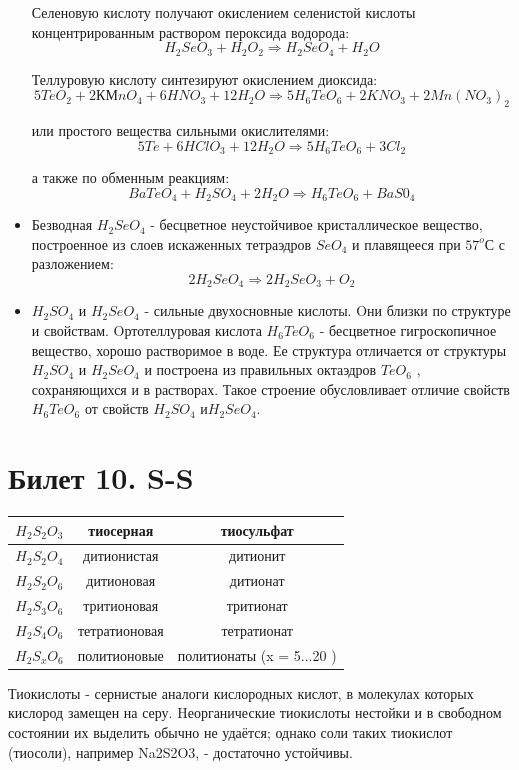 \documentclass[11pt]{article}
\begin{document}
\begin{itemize}
Селеновую кислоту получают окислением селенистой кислоты концентрированным
раствором пероксида водорода:
$$H_2 SeO _3 + H_2 O _2 \Rightarrow H _2 SeO _4 + H _2 O$$

Теллуровую кислоту синтезируют окислением диоксида:
$$5TeO _2 + 2КМnO _4 + 6HNO _3 + 12H_2O \Rightarrow 5H_6 TeO_6 + 2KNO _3 + 2Mn(NO _3 ) _2$$

или простого вещества сильными окислителями:
$$5Te + 6HClO_3 + 12H_2O \Rightarrow 5H _6 TeO _6 + 3Cl _2$$

а также по обменным реакциям:
$$BaTeO _4 + H _2 SO _4 + 2H _2 O \Rightarrow H _6 TeO _6 + BaS0 _4$$

\item Безводная $H _2 SeO _4$ - бесцветное неустойчивое кристаллическое вещество,
построенное из слоев искаженных тетраэдров $SeO _4$ и плавящееся при $57 ^oС$ с
разложением:
$$2 H _2 SeO _4 \Rightarrow 2H _2 SeO _3 + O _2$$

\item $H _2 SO _4$ и $H _2 SeO _4$ - сильные двухосновные кислоты. Oни близки по структуре и свойствам.
Oртотеллуровая кислота $H _6 TeO _6$ - бесцветное гигроскопичное вещество, хорошо
растворимое в воде. Ее структура отличается от структуры  $H _2 SO _4$ и $H _2 SeO _4$ и построена из
правильных октаэдров $TeO _6$ , сохраняющихся и в растворах. Такое строение обусловливает
отличие свойств $H _6 TeO _6$ от свойств $H_2S O _4$ и$ H_2SeO_4$.
\end{itemize}



\section{Билет 10. S-S}
\begin{tabular}{|c|c|c|}
\hline
	$H_2S _2O_3$ & тиосерная& тиосульфат\\
\hline
	$H_2S _2O_4$ & дитионистая& дитионит\\
\hline
	$H_2S _2O_6$ & дитионовая & дитионат\\
\hline
	$H_2S _3O_6$ & тритионовая & тритионат\\
\hline
	$H_2S_4O_6$ & тетратионовая & тетратионат\\
\hline
	$H_2S_xO_6$ & политионовые & политионаты (x = 5...20 )\\
\hline
\end{tabular}

Тиокислоты - сернистые аналоги кислородных кислот, в молекулах которых кислород
замещен на серу. Hеорганические тиокислоты нестойки и в свободном состоянии их
выделить обычно не удаётся; однако соли таких тиокислот (тиосоли), например Na2S2O3, -
достаточно устойчивы.
\end{document}
